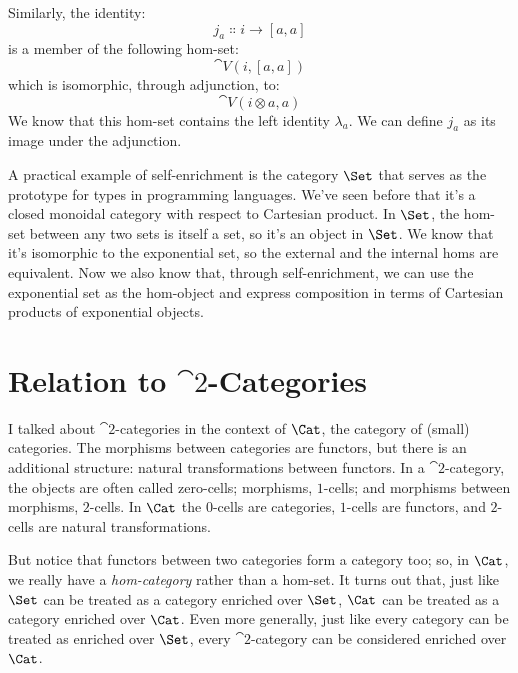 Similarly, the identity:
\[j_a \Colon i \to [a, a]\]
is a member of the following hom-set:
\[\cat{V}(i, [a, a])\]
which is isomorphic, through adjunction, to:
\[\cat{V}(i \otimes a, a)\]
We know that this hom-set contains the left identity $\lambda_a$. We can
define $j_a$ as its image under the adjunction.

A practical example of self-enrichment is the category $\Set$ that
serves as the prototype for types in programming languages. We've seen
before that it's a closed monoidal category with respect to Cartesian
product. In $\Set$, the hom-set between any two sets is itself a
set, so it's an object in $\Set$. We know that it's isomorphic to
the exponential set, so the external and the internal homs are
equivalent. Now we also know that, through self-enrichment, we can use
the exponential set as the hom-object and express composition in terms
of Cartesian products of exponential objects.

\section{Relation to $\cat{2}$-Categories}

I talked about $\cat{2}$-categories in the context of $\Cat$, the category
of (small) categories. The morphisms between categories are functors,
but there is an additional structure: natural transformations between
functors. In a $\cat{2}$-category, the objects are often called zero-cells;
morphisms, $1$-cells; and morphisms between morphisms, $2$-cells. In
$\Cat$ the $0$-cells are categories, $1$-cells are functors, and
$2$-cells are natural transformations.

But notice that functors between two categories form a category too; so,
in $\Cat$, we really have a \emph{hom-category} rather than a
hom-set. It turns out that, just like $\Set$ can be treated as a
category enriched over $\Set$, $\Cat$ can be treated as a
category enriched over $\Cat$. Even more generally, just like
every category can be treated as enriched over $\Set$, every
$\cat{2}$-category can be considered enriched over $\Cat$.
